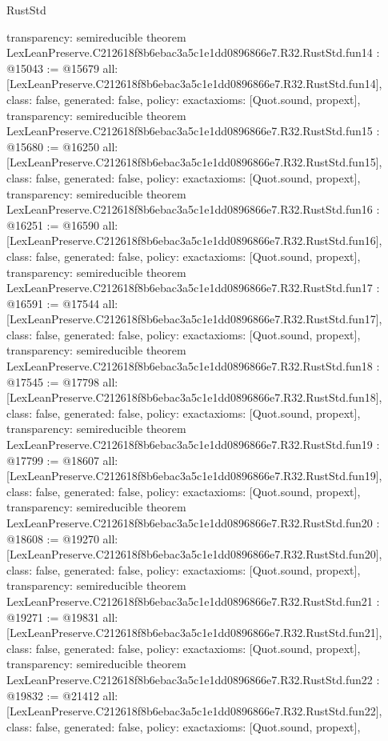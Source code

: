 \begin{lexlean}{RustStd}
\begin{coremodule}
{  transparency: semireducible
}
theorem LexLeanPreserve.C212618f8b6ebac3a5c1e1dd0896866e7.R32.RustStd.fun14 : @15043 := @15679 {
  all: [LexLeanPreserve.C212618f8b6ebac3a5c1e1dd0896866e7.R32.RustStd.fun14],
  class: false,
  generated: false,
  policy: exact{axioms: [Quot.sound, propext]},
  transparency: semireducible
}
theorem LexLeanPreserve.C212618f8b6ebac3a5c1e1dd0896866e7.R32.RustStd.fun15 : @15680 := @16250 {
  all: [LexLeanPreserve.C212618f8b6ebac3a5c1e1dd0896866e7.R32.RustStd.fun15],
  class: false,
  generated: false,
  policy: exact{axioms: [Quot.sound, propext]},
  transparency: semireducible
}
theorem LexLeanPreserve.C212618f8b6ebac3a5c1e1dd0896866e7.R32.RustStd.fun16 : @16251 := @16590 {
  all: [LexLeanPreserve.C212618f8b6ebac3a5c1e1dd0896866e7.R32.RustStd.fun16],
  class: false,
  generated: false,
  policy: exact{axioms: [Quot.sound, propext]},
  transparency: semireducible
}
theorem LexLeanPreserve.C212618f8b6ebac3a5c1e1dd0896866e7.R32.RustStd.fun17 : @16591 := @17544 {
  all: [LexLeanPreserve.C212618f8b6ebac3a5c1e1dd0896866e7.R32.RustStd.fun17],
  class: false,
  generated: false,
  policy: exact{axioms: [Quot.sound, propext]},
  transparency: semireducible
}
theorem LexLeanPreserve.C212618f8b6ebac3a5c1e1dd0896866e7.R32.RustStd.fun18 : @17545 := @17798 {
  all: [LexLeanPreserve.C212618f8b6ebac3a5c1e1dd0896866e7.R32.RustStd.fun18],
  class: false,
  generated: false,
  policy: exact{axioms: [Quot.sound, propext]},
  transparency: semireducible
}
theorem LexLeanPreserve.C212618f8b6ebac3a5c1e1dd0896866e7.R32.RustStd.fun19 : @17799 := @18607 {
  all: [LexLeanPreserve.C212618f8b6ebac3a5c1e1dd0896866e7.R32.RustStd.fun19],
  class: false,
  generated: false,
  policy: exact{axioms: [Quot.sound, propext]},
  transparency: semireducible
}
theorem LexLeanPreserve.C212618f8b6ebac3a5c1e1dd0896866e7.R32.RustStd.fun20 : @18608 := @19270 {
  all: [LexLeanPreserve.C212618f8b6ebac3a5c1e1dd0896866e7.R32.RustStd.fun20],
  class: false,
  generated: false,
  policy: exact{axioms: [Quot.sound, propext]},
  transparency: semireducible
}
theorem LexLeanPreserve.C212618f8b6ebac3a5c1e1dd0896866e7.R32.RustStd.fun21 : @19271 := @19831 {
  all: [LexLeanPreserve.C212618f8b6ebac3a5c1e1dd0896866e7.R32.RustStd.fun21],
  class: false,
  generated: false,
  policy: exact{axioms: [Quot.sound, propext]},
  transparency: semireducible
}
theorem LexLeanPreserve.C212618f8b6ebac3a5c1e1dd0896866e7.R32.RustStd.fun22 : @19832 := @21412 {
  all: [LexLeanPreserve.C212618f8b6ebac3a5c1e1dd0896866e7.R32.RustStd.fun22],
  class: false,
  generated: false,
  policy: exact{axioms: [Quot.sound, propext]},
}
\end{coremodule}
\end{lexlean}

